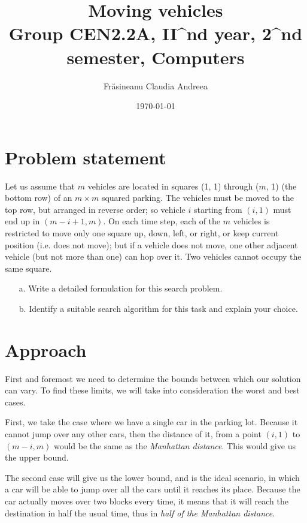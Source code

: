 \documentclass{article}
\begin{document}
\title{Moving vehicles \\
\large{Group CEN2.2A, II^{nd} year, 2^{nd} semester, Computers}}
\date{\today}
\author{Fr\u{a}sineanu Claudia Andreea}
\maketitle

\newpage
\section{Problem statement}
Let us assume that $m$ vehicles are located in squares (1, 1) through ($m$, 1) (the bottom row) of an $m \times m$ squared parking. The vehicles must be moved to the top row, but arranged in reverse order; so vehicle $i$ starting from $(i, 1)$ must end up in $(m - i + 1, m)$. On each time step, each of the $m$ vehicles is restricted to move only one square up, down, left, or right, or keep current position (i.e. does not move); but if a vehicle does not move, one other adjacent vehicle (but not more than one) can hop over it. Two vehicles cannot occupy the same square.

\begin{itemize}
    \item[a.] Write a detailed formulation for this search problem.
    \item[b.] Identify a suitable search algorithm for this task and explain your choice.
\end{itemize}

\section{Approach}
First and foremost we need to determine the bounds between which our solution can vary. To find these limits, we will take into consideration the worst and best cases.


First, we take the case where we have a single car in the parking lot. Because it cannot jump over any other cars, then the distance of it, from a point $(i, 1)$ to $(m-i, m)$ would be the same as the \emph{Manhattan distance}. This would give us the upper bound.

The second case will give us the lower bound, and is the ideal scenario, in which a car will be able to jump over all the cars until it reaches its place. Because the car actually moves over two blocks every time, it means that it will reach the destination in half the usual time, thus in \emph{half of the Manhattan distance}.
\end{document}
